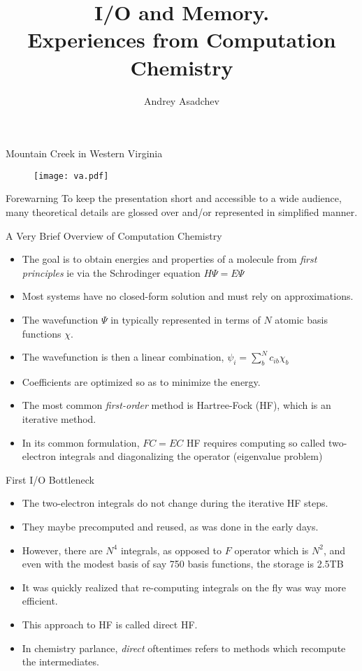 \documentclass{beamer}
\title[I/O and Memory]{I/O and Memory. \\ Experiences from Computation Chemistry}
\author{Andrey Asadchev}
\institute{VT.edu}
\begin{document}
\begin{frame}
  \titlepage
\end{frame}

\begin{frame}{Mountain Creek in Western Virginia}
\begin{figure}[here]
\begin{center}
\texttt{[image: va.pdf]}
\end{center}
\end{figure}
\end{frame}

\begin{frame}{Forewarning}
To keep the presentation short and accessible to a wide audience,
many theoretical details are glossed over and/or represented in simplified manner.
\end{frame}

\begin{frame}{A Very Brief Overview of Computation Chemistry}
\begin{itemize}
\item The goal is to obtain energies and properties of a molecule from {\em first principles}
  ie via the Schrodinger equation $H \Psi = E \Psi$
\item Most systems have no closed-form solution and must rely on approximations.
\item The wavefunction $\Psi$ in typically represented in terms of $N$ atomic basis functions $\chi$.
\item The wavefunction is then a linear combination, $\psi_i = \sum_b^{N} c_{ib} \chi_b$
\item Coefficients are optimized so as to minimize the energy.
\item The most common {\em first-order} method is Hartree-Fock (HF), which is an iterative method.
\item In its common formulation, $FC = EC$ HF requires computing so called two-electron integrals
  and diagonalizing the operator (eigenvalue problem)
\end{itemize}
\end{frame}

\begin{frame}{First I/O Bottleneck}
\begin{itemize}
\item The two-electron integrals do not change during the iterative HF steps.
\item They maybe precomputed and reused, as was done in the early days.
\item However, there are $N^4$ integrals, as opposed to $F$ operator which is $N^2$,
  and even with the modest basis of say 750 basis functions, the storage is 2.5TB
\item It was quickly realized that re-computing integrals on the fly was way more efficient.
\item This approach to HF is called direct HF.
\item In chemistry parlance, {\em direct} oftentimes refers to methods which recompute the intermediates.
\end{itemize}
\end{frame}
\end{document}
